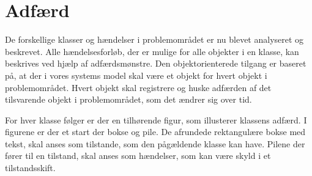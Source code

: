 \section{Adfærd}
\label{sec:adfaerd}

De forskellige klasser og hændelser i problemområdet er nu blevet analyseret og beskrevet. Alle hændelsesforløb, der er mulige for alle objekter i en klasse, kan beskrives ved hjælp af adfærdsmønstre\cite[s.~90]{ooad}. Den objektorienterede tilgang er baseret på, at der i vores systems model skal være et objekt for hvert objekt i problemområdet\cite[s.~91]{ooad}. Hvert objekt skal registrere og huske adfærden af det tilsvarende objekt i problemområdet, som det ændrer sig over tid.

For hver klasse følger er der en tilhørende figur, som illusterer klassens adfærd. I figurene er der et start  der bokse og pile. De afrundede rektangulære bokse med tekst, skal anses som tilstande, som den pågældende klasse kan have. Pilene der fører til en tilstand, skal anses som hændelser, som kan være skyld i et tilstandsskift.







